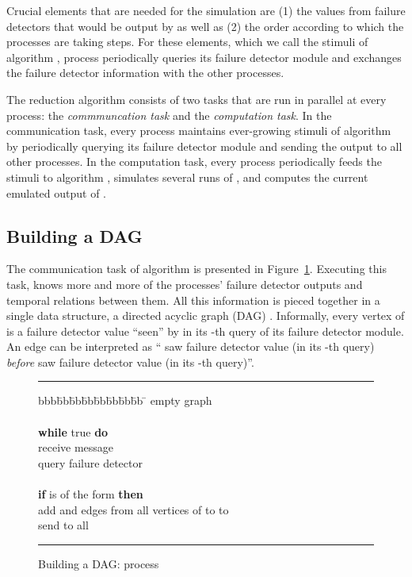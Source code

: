 \documentclass[11pt]{article}
\def\fd{failure detector}
\begin{document}
Crucial elements that are needed for the simulation
	are (1) the values from {\fd}s
	that would be output by  as well as
	(2) the order according to which the processes
	are taking steps.
For these elements, which we call the stimuli of
	algorithm , process  periodically queries its {\fd} module
	and exchanges the {\fd} information with the other processes.


The reduction algorithm  consists of two tasks that are run
	in parallel at every process:
	the \emph{commmuncation task} and the \emph{computation task}.
In the communication task, every process maintains ever-growing stimuli
	of algorithm  by periodically querying its {\fd} module
	and sending the output to all other processes.
In the computation task, every process periodically feeds the stimuli
	to algorithm , simulates several runs of ,
	and computes the current emulated output of .


\subsection{Building a DAG}
\label{subsec:cht:dag}


The communication task of algorithm  is presented in Figure~\ref{fig:CHT-comm}.
Executing this task,  knows more and more of the processes'
	{\fd} outputs and temporal relations between
	them.
All this information is pieced together in a single data structure,
	a directed acyclic graph (DAG) .
Informally, every vertex  of  is a {\fd} value
``seen'' by  in its -th query of its {\fd} module.
An edge   can be  interpreted as
	`` saw {\fd} value  (in its -th query)
\emph{before}  saw {\fd} value  (in its -th query)''.

\begin{figure}[tbp]
\hrule \vspace{2mm}
{\small
\begin{tabbing}
 bbb\=bb\=bb\=bb\=bb\=bb\=bb\=bb \=  \kill
\>  empty graph\\
\> \\
\> \textbf{while} true \textbf{do}\\
\>\>	receive message \\
\smallskip
\>\> 	 query {\fd} \\
\smallskip
\>\>	\\
\>\> \textbf{if}  is of the form  \textbf{then} \\
\>\>	add  and edges from all vertices of  to  to \\
\>\>	send  to all 
\end{tabbing}
\hrule
}
\caption{Building a DAG: process }
\label{fig:CHT-comm}
\end{figure}
\end{document}
